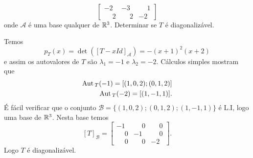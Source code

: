 \begin{exemplo}
\begin{enumerate}[label={\arabic*})]
\[\begin{bmatrix}
								-2 & -3 & \phantom{-}1\\
								\phantom{-}2 & \phantom{-}2 & -2
							\end{bmatrix}
		\]
		onde $\mathcal{A}$ \'e uma base qualquer de $\mathbb{R}^3$. Determinar se $T$ \'e diagonaliz\'avel.
		\begin{solucao}
		Temos
		\[
				p_T(x) = \det([T - xId]_\mathcal{A}) = -(x + 1)^2(x + 2)
			\]
			e assim os autovalores de $T$ s\~ao $\lambda_1 = -1$ e $\lambda_2 = -2$. C\'alculos simples mostram que
			\begin{align*}
				{\rm Aut\,}_T(-1) = [(1,0,2); (0,1,2)]\\
				{\rm Aut\,}_T(-2) = [(1,-1,1)].
			\end{align*}
			\'E f\'acil verificar que o conjunto $\mathcal{B} = \{(1,0,2); (0,1,2); (1,-1,1)\}$ \'e L.I, logo uma base de $\mathbb{R}^3$. Nesta base temos
			\[
				[T]_\mathcal{B} = \begin{bmatrix}
								-1 & \phantom{-}0 & \phantom{-}0\\
								\phantom{-}0 & -1 & \phantom{-}0\\
								\phantom{-}0 & \phantom{-}0 & -2
							\end{bmatrix}.
			\]
			Logo $T$ \'e diagonaliz\'avel.
		\end{solucao}
	\end{enumerate}
\end{exemplo}

